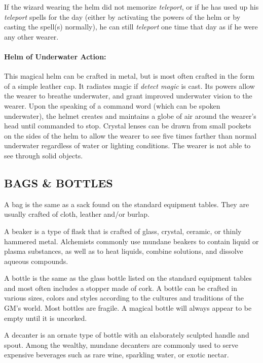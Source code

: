 \begin{multicols}{2}
If the wizard wearing the helm did not memorize \textit{teleport}, or if he has used up his \textit{teleport} spells for the day (either by activating the powers of the helm or by casting the spell(s) normally), he can still \textit{teleport} one time that day as if he were any other wearer.
 
\paragraph{Helm of Underwater Action:} This magical helm can be crafted in metal, but is most often crafted in the form of a simple leather cap.  It radiates magic if \textit{detect magic} is cast.  Its powers allow the wearer to breathe underwater, and grant improved underwater vision to the wearer.  Upon the speaking of a command word (which can be spoken underwater), the helmet creates and maintains a globe of air around the wearer's head until commanded to stop.  Crystal lenses can be drawn from small pockets on the sides of the helm to allow the wearer to see five times farther than normal underwater regardless of water or lighting conditions.  The wearer is not able to see through solid objects.

\subsection{BAGS \& BOTTLES}

A bag is the same as a sack found on the standard equipment tables.  They are usually crafted of cloth, leather and/or burlap.

A beaker is a type of flask that is crafted of glass, crystal, ceramic, or thinly hammered metal.  Alchemists commonly use mundane beakers to contain liquid or plasma substances, as well as to heat liquids, combine solutions, and dissolve aqueous compounds.

A bottle is the same as the glass bottle listed on the standard equipment tables and most often includes a stopper made of cork.  A bottle can be crafted in various sizes, colors and styles according to the cultures and traditions of the GM's world.  Most bottles are fragile.  A magical bottle will always appear to be empty until it is uncorked.

A decanter is an ornate type of bottle with an elaborately sculpted handle and spout.  Among the wealthy, mundane decanters are commonly used to serve expensive beverages such as rare wine, sparkling water, or exotic nectar.  


\end{multicols}
